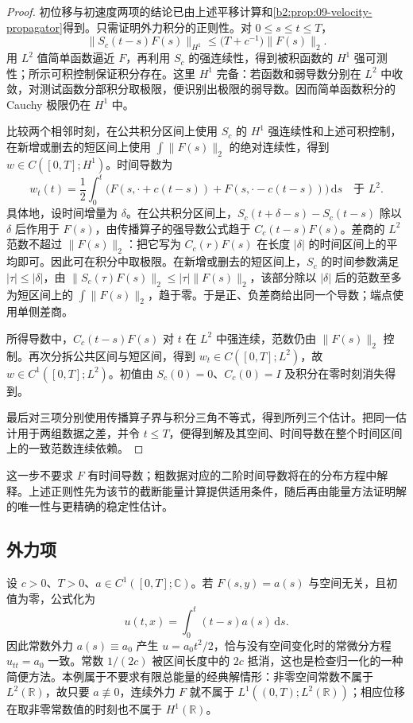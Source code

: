 \begin{proof}
初位移与初速度两项的结论已由上述平移计算和\cref{b2:prop:09-velocity-propagator}得到。只需证明外力积分的正则性。对 \(0\leq s\leq t\leq T\)，
\[
 \|S_c(t-s)F(s)\|_{H^1}
 \leq\bigl(T+c^{-1}\bigr)\|F(s)\|_2.
\]
用 \(L^2\) 值简单函数逼近 \(F\)，再利用 \(S_c\) 的强连续性，得到被积函数的 \(H^1\) 强可测性；所示可积控制保证积分存在。这里 \(H^1\) 完备：若函数和弱导数分别在 \(L^2\) 中收敛，对测试函数分部积分取极限，便识别出极限的弱导数。因而简单函数积分的 Cauchy 极限仍在 \(H^1\) 中。

比较两个相邻时刻，在公共积分区间上使用 \(S_c\) 的 \(H^1\) 强连续性和上述可积控制，在新增或删去的短区间上使用 \(\int\|F(s)\|_2\) 的绝对连续性，得到 \(w\in C([0,T];H^1)\)。时间导数为
\[
 w_t(t)=\frac12\int_0^t
 \bigl(F(s,\cdot+c(t-s))+F(s,\cdot-c(t-s))\bigr)\,\mathrm{d}s
 \quad\text{于 }L^2.
\]
具体地，设时间增量为 \(\delta\)。在公共积分区间上，\(S_c(t+\delta-s)-S_c(t-s)\) 除以 \(\delta\) 后作用于 \(F(s)\)，由传播算子的强导数公式趋于 \(C_c(t-s)F(s)\)。差商的 \(L^2\) 范数不超过 \(\|F(s)\|_2\)：把它写为 \(C_c(r)F(s)\) 在长度 \(|\delta|\) 的时间区间上的平均即可。因此可在积分中取极限。在新增或删去的短区间上，\(S_c\) 的时间参数满足 \(|\tau|\leq|\delta|\)，由 \(\|S_c(\tau)F(s)\|_2\leq|\tau|\|F(s)\|_2\)，该部分除以 \(|\delta|\) 后的范数至多为短区间上的 \(\int\|F(s)\|_2\)，趋于零。于是正、负差商给出同一个导数；端点使用单侧差商。

所得导数中，\(C_c(t-s)F(s)\) 对 \(t\) 在 \(L^2\) 中强连续，范数仍由 \(\|F(s)\|_2\) 控制。再次分拆公共区间与短区间，得到 \(w_t\in C([0,T];L^2)\)，故 \(w\in C^1([0,T];L^2)\)。初值由 \(S_c(0)=0\)、\(C_c(0)=I\) 及积分在零时刻消失得到。

最后对三项分别使用传播算子界与积分三角不等式，得到所列三个估计。把同一估计用于两组数据之差，并令 \(t\leq T\)，便得到解及其空间、时间导数在整个时间区间上的一致范数连续依赖。
\end{proof}

这一步不要求 \(F\) 有时间导数；粗数据对应的二阶时间导数将在的分布方程中解释。上述正则性先为该节的截断能量计算提供适用条件，随后再由能量方法证明解的唯一性与更精确的稳定性估计。

\subsection{外力项}
\label{b2:subsec:090202}

设 \(c>0\)、\(T>0\)、\(a\in C^1([0,T];\mathbb C)\)。若 \(F(s,y)=a(s)\) 与空间无关，且初值为零，公式化为
\[
 u(t,x)=\int_0^t(t-s)a(s)\,\mathrm{d}s.
\]
因此常数外力 \(a(s)\equiv a_0\) 产生 \(u=a_0t^2/2\)，恰与没有空间变化时的常微分方程 \(u_{tt}=a_0\) 一致。常数 \(1/(2c)\) 被区间长度中的 \(2c\) 抵消，这也是检查归一化的一种简便方法。本例属于不要求有限总能量的经典解情形：非零空间常数不属于 \(L^2(\mathbb R)\)，故只要 \(a\not\equiv0\)，连续外力 \(F\) 就不属于 \(L^1((0,T);L^2(\mathbb R))\)；相应位移在取非零常数值的时刻也不属于 \(H^1(\mathbb R)\)。

